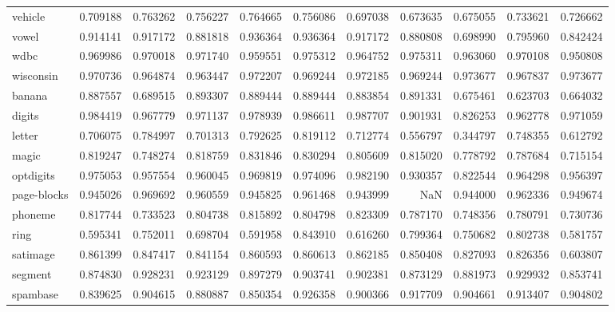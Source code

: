 \begin{tabular}{lrrrrrrrrrr}
vehicle         &   0.709188 &  0.763262 &  0.756227 &  0.764665 &  0.756086 &  0.697038 &  0.673635 &  0.675055 &  0.733621 &  0.726662 \\
vowel           &   0.914141 &  0.917172 &  0.881818 &  0.936364 &  0.936364 &  0.917172 &  0.880808 &  0.698990 &  0.795960 &  0.842424 \\
wdbc            &   0.969986 &  0.970018 &  0.971740 &  0.959551 &  0.975312 &  0.964752 &  0.975311 &  0.963060 &  0.970108 &  0.950808 \\
wisconsin       &   0.970736 &  0.964874 &  0.963447 &  0.972207 &  0.969244 &  0.972185 &  0.969244 &  0.973677 &  0.967837 &  0.973677 \\
banana          &   0.887557 &  0.689515 &  0.893307 &  0.889444 &  0.889444 &  0.883854 &  0.891331 &  0.675461 &  0.623703 &  0.664032 \\
digits          &   0.984419 &  0.967779 &  0.971137 &  0.978939 &  0.986611 &  0.987707 &  0.901931 &  0.826253 &  0.962778 &  0.971059 \\
letter          &   0.706075 &  0.784997 &  0.701313 &  0.792625 &  0.819112 &  0.712774 &  0.556797 &  0.344797 &  0.748355 &  0.612792 \\
magic           &   0.819247 &  0.748274 &  0.818759 &  0.831846 &  0.830294 &  0.805609 &  0.815020 &  0.778792 &  0.787684 &  0.715154 \\
optdigits       &   0.975053 &  0.957554 &  0.960045 &  0.969819 &  0.974096 &  0.982190 &  0.930357 &  0.822544 &  0.964298 &  0.956397 \\
page-blocks     &   0.945026 &  0.969692 &  0.960559 &  0.945825 &  0.961468 &  0.943999 &       NaN &  0.944000 &  0.962336 &  0.949674 \\
phoneme         &   0.817744 &  0.733523 &  0.804738 &  0.815892 &  0.804798 &  0.823309 &  0.787170 &  0.748356 &  0.780791 &  0.730736 \\
ring            &   0.595341 &  0.752011 &  0.698704 &  0.591958 &  0.843910 &  0.616260 &  0.799364 &  0.750682 &  0.802738 &  0.581757 \\
satimage        &   0.861399 &  0.847417 &  0.841154 &  0.860593 &  0.860613 &  0.862185 &  0.850408 &  0.827093 &  0.826356 &  0.603807 \\
segment         &   0.874830 &  0.928231 &  0.923129 &  0.897279 &  0.903741 &  0.902381 &  0.873129 &  0.881973 &  0.929932 &  0.853741 \\
spambase        &   0.839625 &  0.904615 &  0.880887 &  0.850354 &  0.926358 &  0.900366 &  0.917709 &  0.904661 &  0.913407 &  0.904802 \\

\end{tabular}
